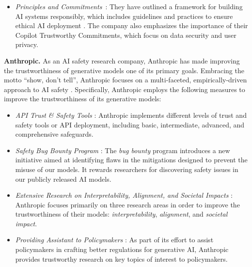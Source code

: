 \begin{itemize}[nolistsep, leftmargin=*]
    \item[] \textcolor[HTML]{f3b609}{\largedot} {\textit{Principles and Commitments}}~\cite{microsoft_commitments_2023, microsoft_framework_for_building_ai_systems_responsibly, microsoft_copilot_trustworthy_commitments}: They have outlined a framework for building AI systems responsibly, which includes guidelines and practices to ensure ethical AI deployment \cite{microsoft_framework_for_building_ai_systems_responsibly}. The company also emphasizes the importance of their Copilot Trustworthy Commitments, which focus on data security and user privacy. 
\end{itemize}



\textbf{Anthropic.}
As an AI safety research company, Anthropic has made improving the trustworthiness of generative models one of its primary goals. Embracing the motto ``show, don't tell'', Anthropic focuses on a multi-faceted, empirically-driven approach to AI safety \cite{anthropic_core_views}. Specifically, Anthropic employs the following measures to improve the trustworthiness of its generative models:

\begin{itemize}[nolistsep, leftmargin=*]
    \item[] \textcolor[HTML]{cd9d7b}{\largedot}  {\textit{API Trust \& Safety Tools}} \cite{anthropic_api}: Anthropic implements different levels of trust and safety tools or API deployment, including basic, intermediate, advanced, and comprehensive safeguards. 
    \item[] \textcolor[HTML]{cd9d7b}{\largedot}  {\textit{Safety Bug Bounty Program}} \cite{anthropic_bounty}: The \textit{bug bounty} program introduces a new initiative aimed at identifying flaws in the mitigations designed to prevent the misuse of our models. It rewards researchers for discovering safety issues in our publicly released AI models.
    \item[] \textcolor[HTML]{cd9d7b}{\largedot}  {\textit{Extensive Research on Interpretability, Alignment, and Societal Impacts}} \cite{anthropic_research}: Anthropic focuses primarily on three research areas in order to improve the trustworthiness of their models: \textit{interpretability}, \textit{alignment}, and \textit{societal impact}. 
    \item[] \textcolor[HTML]{cd9d7b}{\largedot}  {\textit{Providing Assistant to Policymakers}} \cite{mishra2020measurement, anthropic_election, anthropic_constitutional}: As part of its effort to assist policymakers in crafting better regulations for generative AI, Anthropic provides trustworthy research on key topics of interest to policymakers.
\end{itemize}






